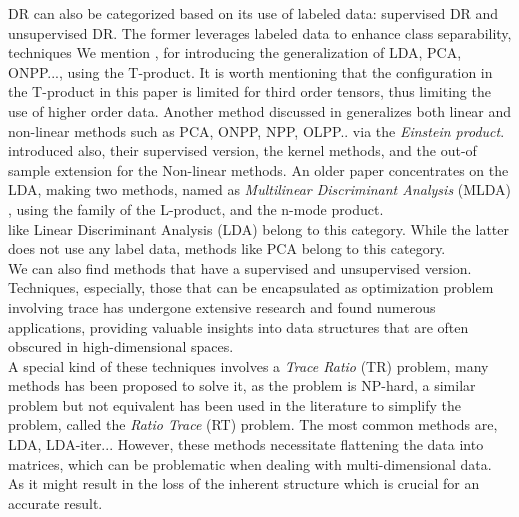 \documentclass{siamltex}
\begin{document}
DR can also be categorized based on its use of labeled data: supervised DR and unsupervised DR. The former leverages labeled data to enhance class separability, techniques We mention \cite{bouallala2024trace}, for introducing the generalization of LDA, PCA, ONPP..., using the T-product. It is worth mentioning that the configuration in the T-product in this paper is limited for third order tensors, thus limiting the use of higher order data. Another method discussed in \cite{zahir2024higher} generalizes both linear and non-linear methods such as PCA, ONPP, NPP, OLPP.. via the \textit{Einstein product}. \cite{zahir2024higher} introduced also, their supervised version, the kernel methods, and the out-of sample extension for the Non-linear methods. An older paper concentrates on the LDA, making two methods, named as \textit{Multilinear Discriminant Analysis} (MLDA) \cite{dufrenois2023multilinear}, using the family of the L-product, and the n-mode product.\\
like Linear Discriminant Analysis (LDA) belong to this category. While the latter does not use any label data, methods like PCA belong to this category.\\
We can also find methods that have a supervised and unsupervised version.\\
Techniques, especially, those that can be encapsulated as optimization problem involving trace has undergone extensive research and found numerous applications, providing valuable insights into data structures that are often obscured in high-dimensional spaces.\\
A special kind of these techniques involves a \textit{Trace Ratio} (TR) problem, many methods has been proposed to solve it, as the problem is NP-hard, a similar problem but not equivalent has been used in the literature to simplify the problem, called the \textit{Ratio Trace} (RT) problem. The most common methods are, LDA, LDA-iter... However, these methods necessitate flattening the data into matrices, which can be problematic when dealing with multi-dimensional data. As it might result in the loss of the inherent structure which is crucial for an accurate result.
\end{document}
